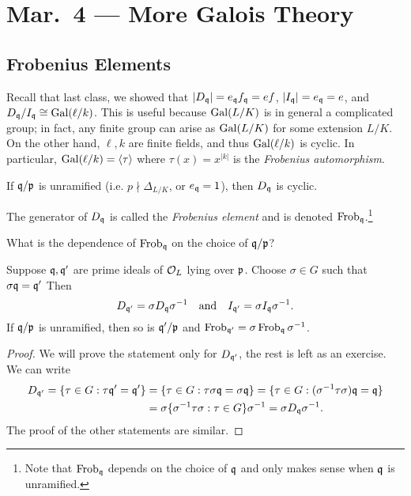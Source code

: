 \chapter{Mar.~4 --- More Galois Theory}

\section{Frobenius Elements}
\begin{remark}
  Recall that last class, we showed that
  $|D_{\mathfrak{q}}| = e_{\mathfrak{q}} f_{\mathfrak{q}} = ef$,
  $|I_{\mathfrak{q}}| = e_{\mathfrak{q}} = e$, and
  $D_{\mathfrak{q}} / I_{\mathfrak{q}} \cong \operatorname{Gal}(\ell / k)$.
  This is
  useful because $\operatorname{Gal}(L / K)$ is in general a complicated
  group; in fact, any finite group can
  arise as $\operatorname{Gal}(L / K)$ for some extension
  $L / K$. On the other hand, $\ell, k$ are
  finite fields, and thus $\operatorname{Gal}(\ell / k)$
  is cyclic. In particular, $\operatorname{Gal}(\ell / k) = \langle \tau \rangle$
  where $\tau(x) = x^{|k|}$ is the
  \emph{Frobenius automorphism}.
\end{remark}

\begin{corollary}
  If $\mathfrak{q} / \mathfrak{p}$ is unramified (i.e.
  $p \nmid \Delta_{L / K}$, or $e_{\mathfrak{q}} = 1$), then
  $D_{\mathfrak{q}}$ is cyclic.
\end{corollary}

\begin{definition}
  The generator of $D_{\mathfrak{q}}$ is called
  the \emph{Frobenius element} and is denoted
  $\operatorname{Frob}_{\mathfrak{q}}$.\footnote{Note that $\operatorname{Frob}_{\mathfrak{q}}$ depends on the choice of $\mathfrak{q}$ and only makes sense when $\mathfrak{q}$ is unramified.}
\end{definition}

\begin{remark}
  What is the dependence of $\operatorname{Frob}_{\mathfrak{q}}$ on
  the choice of $\mathfrak{q} / \mathfrak{p}$?
\end{remark}

\begin{lemma}
  Suppose $\mathfrak{q}, \mathfrak{q}'$ are prime ideals of $\mathcal{O}_L$ lying
  over $\mathfrak{p}$. Choose $\sigma \in G$ such that
  $\sigma \mathfrak{q} = \mathfrak{q}'$ Then
  \[
    D_{\mathfrak{q}'} = \sigma D_{\mathfrak{q}} \sigma^{-1}
    \quad \text{and} \quad
    I_{\mathfrak{q}'} = \sigma I_{\mathfrak{q}} \sigma^{-1}.
  \]
  If $\mathfrak{q} / \mathfrak{p}$ is unramified, then so is
  $\mathfrak{q}' / \mathfrak{p}$ and
  $\operatorname{Frob}_{\mathfrak{q}'} = \sigma \operatorname{Frob}_{\mathfrak{q}} \sigma^{-1}$.
\end{lemma}

\begin{proof}
  We will prove the statement only for $D_{\mathfrak{q}'}$, the
  rest is left as an exercise. We can write
  \begin{align*}
    D_{\mathfrak{q}'}
    = \{\tau \in G : \tau \mathfrak{q}' = \mathfrak{q}'\}
    &= \{\tau \in G : \tau \sigma \mathfrak{q} = \sigma \mathfrak{q}\}
    = \{\tau \in G : (\sigma^{-1} \tau \sigma) \mathfrak{q} = \mathfrak{q}\} \\
    &= \sigma \{\sigma^{-1} \tau \sigma : \tau \in G\} \sigma^{-1}
    = \sigma D_{\mathfrak{q}} \sigma^{-1}.
  \end{align*}
  The proof of the other statements are similar.
\end{proof}

